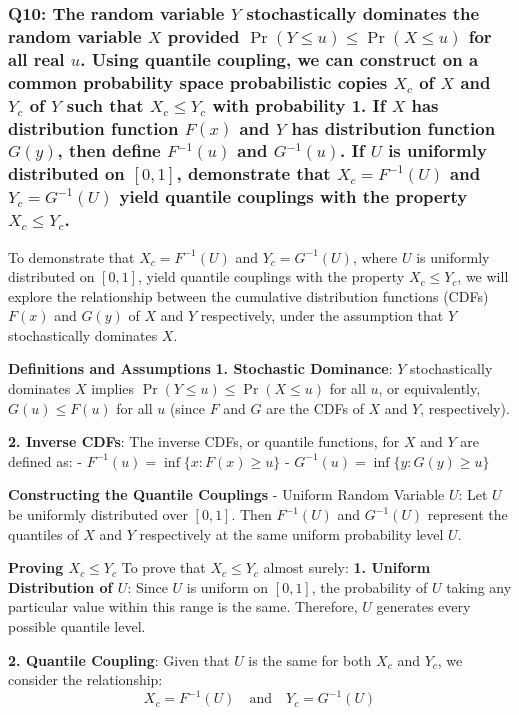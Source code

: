\documentclass[8pt]{article}
\begin{document}
\subsubsection*{Q10:
The random variable \(Y\) stochastically dominates the random variable \(X\) provided \(\Pr(Y \leq u) \leq \Pr(X \leq u)\) for all real \(u\). Using quantile coupling, we can construct on a common probability space probabilistic copies \(X_c\) of \(X\) and \(Y_c\) of \(Y\) such that \(X_c \leq Y_c\) with probability 1. If \(X\) has distribution function \(F(x)\) and \(Y\) has distribution function \(G(y)\), then define \(F^{-1}(u)\) and \(G^{-1}(u)\). If \(U\) is uniformly distributed on \([0, 1]\), demonstrate that \(X_c = F^{-1}(U)\) and \(Y_c = G^{-1}(U)\) yield quantile couplings with the property \(X_c \leq Y_c\).}

To demonstrate that \(X_c = F^{-1}(U)\) and \(Y_c = G^{-1}(U)\), where \(U\) is uniformly distributed on \([0, 1]\), yield quantile couplings with the property \(X_c \leq Y_c\), we will explore the relationship between the cumulative distribution functions (CDFs) \(F(x)\) and \(G(y)\) of \(X\) and \(Y\) respectively, under the assumption that \(Y\) stochastically dominates \(X\).

\textbf{Definitions and Assumptions}
\textbf{1. Stochastic Dominance}: \(Y\) stochastically dominates \(X\) implies \(\Pr(Y \leq u) \leq \Pr(X \leq u)\) for all \(u\), or equivalently, \(G(u) \leq F(u)\) for all \(u\) (since \(F\) and \(G\) are the CDFs of \(X\) and \(Y\), respectively).

\textbf{2. Inverse CDFs}: The inverse CDFs, or quantile functions, for \(X\) and \(Y\) are defined as:
   - \(F^{-1}(u) = \inf \{ x : F(x) \geq u \}\)
   - \(G^{-1}(u) = \inf \{ y : G(y) \geq u \}\)

\textbf{Constructing the Quantile Couplings}
- Uniform Random Variable \(U\): Let \(U\) be uniformly distributed over \([0, 1]\). Then \(F^{-1}(U)\) and \(G^{-1}(U)\) represent the quantiles of \(X\) and \(Y\) respectively at the same uniform probability level \(U\).

\textbf{Proving \(X_c \leq Y_c\)}
To prove that \(X_c \leq Y_c\) almost surely:
\textbf{1. Uniform Distribution of \(U\)}: Since \(U\) is uniform on \([0, 1]\), the probability of \(U\) taking any particular value within this range is the same. Therefore, \(U\) generates every possible quantile level.

\textbf{2. Quantile Coupling}: Given that \(U\) is the same for both \(X_c\) and \(Y_c\), we consider the relationship:
   \[
   X_c = F^{-1}(U) \quad \text{and} \quad Y_c = G^{-1}(U)
   \]
\end{document}
